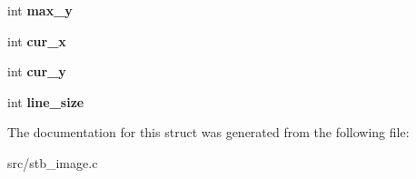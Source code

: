 \begin{DoxyCompactItemize}
\item 
\hypertarget{structstbi__gif__struct_aff3410e0fff097d4719e54096f6da69b}{}int {\bfseries max\+\_\+y}\label{structstbi__gif__struct_aff3410e0fff097d4719e54096f6da69b}

\item 
\hypertarget{structstbi__gif__struct_adbc7ae7e9ff2e2abdf66eb0e1a4b3ffb}{}int {\bfseries cur\+\_\+x}\label{structstbi__gif__struct_adbc7ae7e9ff2e2abdf66eb0e1a4b3ffb}

\item 
\hypertarget{structstbi__gif__struct_ac61865216c4b578c235f5b8170c2036c}{}int {\bfseries cur\+\_\+y}\label{structstbi__gif__struct_ac61865216c4b578c235f5b8170c2036c}

\item 
\hypertarget{structstbi__gif__struct_a5b7d7625c253025ff5ee4169afbf06b7}{}int {\bfseries line\+\_\+size}\label{structstbi__gif__struct_a5b7d7625c253025ff5ee4169afbf06b7}

\end{DoxyCompactItemize}


The documentation for this struct was generated from the following file\+:\begin{DoxyCompactItemize}
\item 
src/stb\+\_\+image.\+c\end{DoxyCompactItemize}

